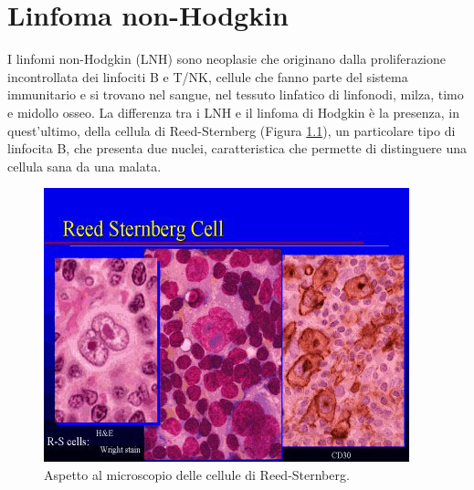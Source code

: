 \chapter{Linfoma non-Hodgkin}

I linfomi non-Hodgkin (LNH) sono neoplasie che originano dalla proliferazione incontrollata dei linfociti B e T/NK, 
cellule che fanno parte del sistema immunitario e si trovano nel sangue, nel tessuto linfatico di linfonodi, milza, 
timo e midollo osseo\cite{LNHAIL}. La differenza tra i LNH e il linfoma di Hodgkin è la presenza, in quest'ultimo,
della cellula di Reed-Sternberg (Figura \ref{fig:FIGURE_2.2}), un particolare tipo di linfocita B, che presenta due nuclei, 
caratteristica che permette di distinguere una cellula sana da una malata\cite{LNHAIMAC}.

\begin{figure}[H]
    \begin{center}
    \includegraphics[width=0.4\columnwidth]{img/Reed-Sternberg.jpeg}
    \vspace{-3mm}
    \end{center}
    \caption{Aspetto al microscopio delle cellule di Reed-Sternberg.
    \cite{MSD}}
    \label{fig:FIGURE_2.2}
\end{figure}

